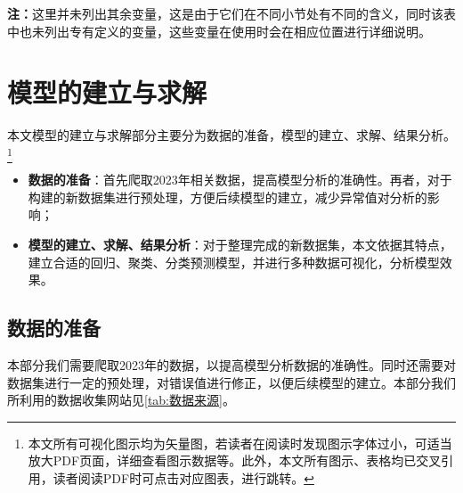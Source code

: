 \documentclass{MathModeling}
\begin{document}
	\textbf{注：}这里并未列出其余变量，这是由于它们在不同小节处有不同的含义，同时该表中也未列出专有定义的变量，这些变量在使用时会在相应位置进行详细说明。
	\section{模型的建立与求解}
	本文模型的建立与求解部分主要分为数据的准备，模型的建立、求解、结果分析。\textcolor{blue}{\footnote{本文所有可视化图示均为矢量图，若读者在阅读时发现图示字体过小，可适当放大PDF页面，详细查看图示数据等。此外，本文所有图示、表格均已交叉引用，读者阅读PDF时可点击对应图表，进行跳转。}}
	\begin{itemize}
		\item \textbf{数据的准备}：首先爬取2023年相关数据，提高模型分析的准确性。再者，对于构建的新数据集进行预处理，方便后续模型的建立，减少异常值对分析的影响；
		\item \textbf{模型的建立、求解、结果分析}：对于整理完成的新数据集，本文依据其特点，建立合适的回归、聚类、分类预测模型，并进行多种数据可视化，分析模型效果。
	\end{itemize}

	\subsection{数据的准备}
	本部分我们需要爬取2023年的数据，以提高模型分析数据的准确性。同时还需要对数据集进行一定的预处理，对错误值进行修正，以便后续模型的建立。本部分我们所利用的数据收集网站见\textcolor{blue}{\cref{tab:数据来源}}。

\begin{table}[H]
	\centering
	\caption{数据来源}
	\label{tab:数据来源}
\end{table}
\end{document}
